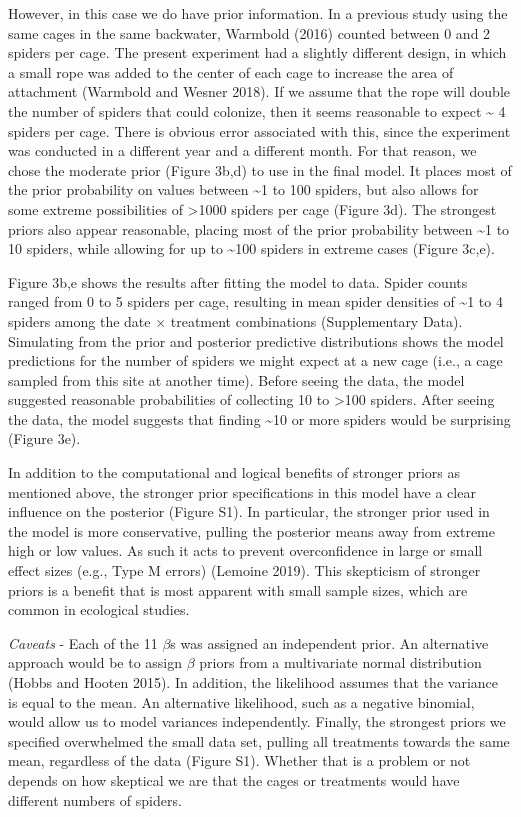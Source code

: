 \documentclass[
  12pt,
]{article}
\begin{document}
However, in this case we do have prior information. In a previous study
using the same cages in the same backwater, Warmbold (2016) counted
between 0 and 2 spiders per cage. The present experiment had a slightly
different design, in which a small rope was added to the center of each
cage to increase the area of attachment (Warmbold and Wesner 2018). If
we assume that the rope will double the number of spiders that could
colonize, then it seems reasonable to expect \textasciitilde{} 4 spiders
per cage. There is obvious error associated with this, since the
experiment was conducted in a different year and a different month. For
that reason, we chose the moderate prior (Figure 3b,d) to use in the
final model. It places most of the prior probability on values between
\textasciitilde1 to 100 spiders, but also allows for some extreme
possibilities of \textgreater1000 spiders per cage (Figure 3d). The
strongest priors also appear reasonable, placing most of the prior
probability between \textasciitilde1 to 10 spiders, while allowing for
up to \textasciitilde100 spiders in extreme cases (Figure 3c,e).

Figure 3b,e shows the results after fitting the model to data. Spider
counts ranged from 0 to 5 spiders per cage, resulting in mean spider
densities of \textasciitilde1 to 4 spiders among the date \(\times\)
treatment combinations (Supplementary Data). Simulating from the prior
and posterior predictive distributions shows the model predictions for
the number of spiders we might expect at a new cage (i.e., a cage
sampled from this site at another time). Before seeing the data, the
model suggested reasonable probabilities of collecting 10 to
\textgreater100 spiders. After seeing the data, the model suggests that
finding \textasciitilde10 or more spiders would be surprising (Figure
3e).

In addition to the computational and logical benefits of stronger priors
as mentioned above, the stronger prior specifications in this model have
a clear influence on the posterior (Figure S1). In particular, the
stronger prior used in the model is more conservative, pulling the
posterior means away from extreme high or low values. As such it acts to
prevent overconfidence in large or small effect sizes (e.g., Type M
errors) (Lemoine 2019). This skepticism of stronger priors is a benefit
that is most apparent with small sample sizes, which are common in
ecological studies.

\emph{Caveats} - Each of the 11 \(\beta\)s was assigned an independent
prior. An alternative approach would be to assign \(\beta\) priors from
a multivariate normal distribution (Hobbs and Hooten 2015). In addition,
the likelihood assumes that the variance is equal to the mean. An
alternative likelihood, such as a negative binomial, would allow us to
model variances independently. Finally, the strongest priors we
specified overwhelmed the small data set, pulling all treatments towards
the same mean, regardless of the data (Figure S1). Whether that is a
problem or not depends on how skeptical we are that the cages or
treatments would have different numbers of spiders.
\end{document}

